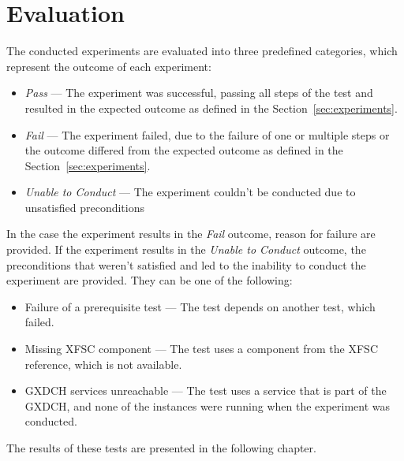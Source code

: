 \section{Evaluation}\label{sec:evaluation}

The conducted experiments are evaluated into three predefined categories, which represent the outcome of each experiment:

\begin{itemize}
    \item \textit{Pass} --- The experiment was successful, passing all steps of the test and resulted in the expected outcome as defined in the Section~\ref{sec:experiments}.
    \item \textit{Fail} --- The experiment failed, due to the failure of one or multiple steps or the outcome differed from the expected outcome as defined in the Section~\ref{sec:experiments}.
    \item \textit{Unable to Conduct} --- The experiment couldn't be conducted due to unsatisfied preconditions
\end{itemize}

In the case the experiment results in the \textit{Fail} outcome, reason for failure are provided.
If the experiment results in the \textit{Unable to Conduct} outcome, the preconditions that weren't satisfied and led to the inability to conduct the experiment are provided.
They can be one of the following:
\begin{itemize}
    \item Failure of a prerequisite test --- The test depends on another test, which failed.
    \item Missing XFSC component --- The test uses a component from the XFSC reference, which is not available.
    \item GXDCH services unreachable --- The test uses a service that is part of the GXDCH, and none of the instances were running when the experiment was conducted.
\end{itemize}

The results of these tests are presented in the following chapter.

